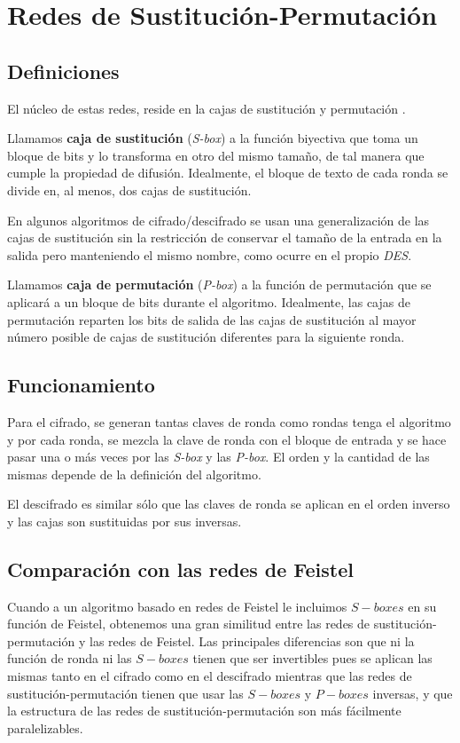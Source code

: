 \section{Redes de Sustitución-Permutación}
\label{sec:spnet}

\subsection{Definiciones}
El núcleo de estas redes, reside en la cajas de sustitución y permutación \cite{SP_Def}.

\begin{dfn}
	Llamamos \textbf{caja de sustitución} (\textit{S-box}) a la función biyectiva que toma un bloque de bits y lo transforma en otro del mismo tamaño, de tal manera que cumple la propiedad de difusión. Idealmente, el bloque de texto de cada ronda se divide en, al menos, dos cajas de sustitución.
	
	En algunos algoritmos de cifrado/descifrado se usan una generalización de las cajas de sustitución sin la restricción de conservar el tamaño de la entrada en la salida pero manteniendo el mismo nombre, como ocurre en el propio \textit{DES}.
\end{dfn}

\begin{dfn}
	Llamamos \textbf{caja de permutación} (\textit{P-box}) a la función de permutación que se aplicará a un bloque de bits durante el algoritmo. Idealmente, las cajas de permutación reparten los bits de salida de las cajas de sustitución al mayor número posible de cajas de sustitución diferentes para la siguiente ronda.
\end{dfn}

\subsection{Funcionamiento}
Para el cifrado, se generan tantas claves de ronda como rondas tenga el algoritmo y por cada ronda, se mezcla la clave de ronda con el bloque de entrada y se hace pasar una o más veces por las \textit{S-box} y las \textit{P-box}. El orden y la cantidad de las mismas depende de la definición del algoritmo.

El descifrado es similar sólo que las claves de ronda se aplican en el orden inverso y las cajas son sustituidas por sus inversas.

\subsection{Comparación con las redes de Feistel}
Cuando a un algoritmo basado en redes de Feistel le incluimos $S-boxes$ en su función de Feistel, obtenemos una gran similitud entre las redes de sustitución-permutación y las redes de Feistel. Las principales diferencias son que ni la función de ronda ni las $S-boxes$ tienen que ser invertibles pues se aplican las mismas tanto en el cifrado como en el descifrado mientras que las redes de sustitución-permutación tienen que usar las $S-boxes$ y $P-boxes$ inversas, y que la estructura de las redes de sustitución-permutación son más fácilmente paralelizables.

